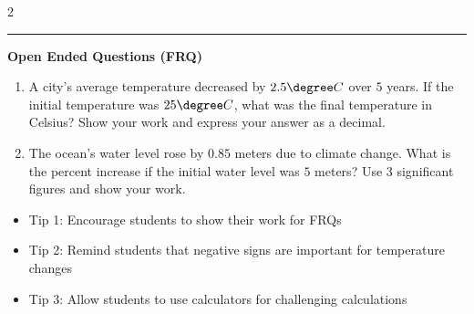 \documentclass[10pt]{article}
\begin{document}
\begin{multicols}{2}
\begin{enumerate}[label=\textbf{Q\arabic*.}, leftmargin=*, itemsep=6pt, parsep=0pt]
\end{enumerate}
\end{multicols}

\vspace{-0.2cm}
\hrule
\vspace{0.2cm}
\textbf{\small Open Ended Questions (FRQ)}
\begin{enumerate}[label=\textbf{Q\arabic*.}, start=9, itemsep=5pt, topsep=0pt]

  \item \small A city's average temperature decreased by $2.5\degree C$ over $5$ years. If the initial temperature was $25\degree C$, what was the final temperature in Celsius? Show your work and express your answer as a decimal. \vspace{2cm}

  \item \small The ocean's water level rose by $0.85$ meters due to climate change. What is the percent increase if the initial water level was $5$ meters? Use $3$ significant figures and show your work. \vspace{2cm}

\end{enumerate}

\vfill

\begin{tcolorbox}[colback=blue!5, colframe=mainblue!50, title=\small \textbf{Chef's Tips}, fonttitle=\bfseries, bottom=1mm]
\begin{itemize}[noitemsep, topsep=2pt, leftmargin=0.5cm]
  \item \scriptsize Tip 1: Encourage students to show their work for FRQs\item \scriptsize Tip 2: Remind students that negative signs are important for temperature changes\item \scriptsize Tip 3: Allow students to use calculators for challenging calculations
\end{itemize}
\end{tcolorbox}
\end{document}
